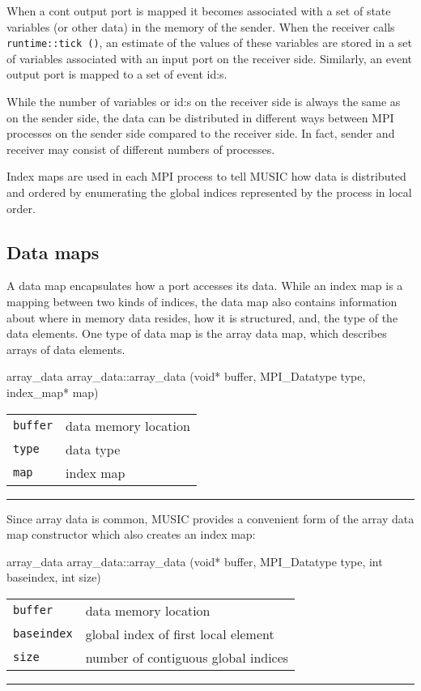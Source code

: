 \documentclass[a4paper]{report}
\makeatletter
\newenvironment{parameters}%
{\begin{tabular}{@{\hspace{2em}}lp{0.6\textwidth}}}%
{\end{tabular}\par\vspace{1mm}\par\hrule\par\vspace{5mm}}
\makeatother
\begin{document}
When a cont output port is mapped it becomes associated with a set of
state variables (or other data) in the memory of the sender.  When the
receiver calls \lstinline|runtime::tick ()|, an estimate of the values
of these variables are stored in a set of variables associated with an
input port on the receiver side.  Similarly, an event output port is
mapped to a set of event id:s.

While the number of variables or id:s on the receiver side is always
the same as on the sender side, the data can be distributed in
different ways between MPI processes on the sender side compared to
the receiver side.  In fact, sender and receiver may consist of
different numbers of processes.

Index maps are used in each MPI process to tell MUSIC how data is
distributed and ordered by enumerating the global indices represented
by the process in local order.

\subsection{Data maps}
\label{sec:datamap}

A data map encapsulates how a port accesses its data.  While an index
map is a mapping between two kinds of indices, the data map also
contains information about where in memory data resides, how it is
structured, and, the type of the data elements.  One type of data map
is the array data map, which describes arrays of data elements.

\begin{head}{array_data}
  array_data::array_data (void* buffer, MPI_Datatype type,
                          index_map* map)
\end{head}
\begin{parameters}
  \lstinline|buffer| & data memory location \\
  \lstinline|type|   & data type \\
  \lstinline|map|    & index map \\
\end{parameters}

Since array data is common, MUSIC provides a convenient form of the
array data map constructor which also creates an index map:

\begin{head}{array_data}
  array_data::array_data (void* buffer,
                          MPI_Datatype type,
                          int  baseindex,
                          int size)
\end{head}
\begin{parameters}
  \lstinline|buffer|    & data memory location \\
  \lstinline|baseindex| & global index of first local element \\
  \lstinline|size|      & number of contiguous global indices \\
\end{parameters}
\end{document}
